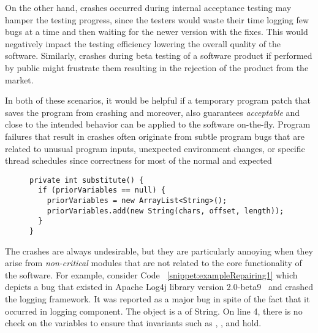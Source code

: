 On the other hand,
crashes occurred during internal acceptance testing may hamper the 
testing progress, since the testers would waste their time logging few bugs at a
time and then waiting for the newer version with the fixes.
This would negatively impact the testing efficiency lowering the overall quality
of the software.
Similarly, crashes during beta testing of a software product if performed by
public might frustrate them 
resulting in the rejection of the product from the market.

In both of these scenarios, it would be helpful if a temporary program patch
that saves the program from crashing
and moreover, also guarantees \textit{acceptable} and close to the intended
behavior
can be applied to the software on-the-fly. Program failures that result in
crashes often originate from subtle
program bugs that are related to unusual program inputs, unexpected environment
changes, or specific
thread schedules since correctness for most of the normal and expected 




\lstset{language=Java , caption=Apache Log4j bug example.,
label=snippet:exampleRepairing1}
\begin{figure}[t]
\begin{lstlisting}
private int substitute() {
  if (priorVariables == null) {
    priorVariables = new ArrayList<String>();
    priorVariables.add(new String(chars, offset, length));
  }
}
\end{lstlisting}
\end{figure}

The crashes are always undesirable, but they are particularly annoying when they
arise from \textit{non-critical} modules
that are not related to the core functionality of the software. For example,
consider Code ~\ref{snippet:exampleRepairing1} which depicts a
bug that
existed in Apache Log4j library version 2.0-beta9~\cite{ApacheLog4jBug} and
crashed
the logging framework. It was reported as a major bug in
spite of the fact that it occurred in logging component. The object
 is a  of String. On line 4, there is no check
on the variables to ensure
that invariants such as , , and  hold.

